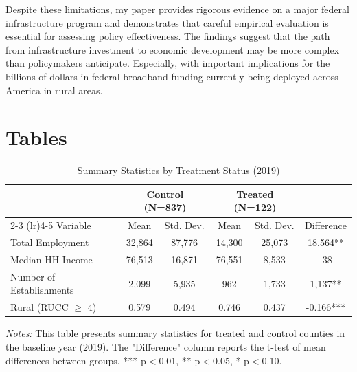\documentclass[12pt]{article}
\begin{document}
Despite these limitations, my paper provides rigorous evidence on a major federal infrastructure program and demonstrates that careful empirical evaluation is essential for assessing policy effectiveness. The findings suggest that the path from infrastructure investment to economic development may be more complex than policymakers anticipate. Especially, with important implications for the billions of dollars in federal broadband funding currently being deployed across America in rural areas.

\newpage


\section*{Tables}

\begin{table}[H]
\centering
\caption{Summary Statistics by Treatment Status (2019)}
\label{tab:summary}
\begin{tabular}{lccccc}
\toprule
& \multicolumn{2}{c}{Control (N=837)} & \multicolumn{2}{c}{Treated (N=122)} & \\
\cmidrule(lr){2-3} \cmidrule(lr){4-5}
Variable & Mean & Std. Dev. & Mean & Std. Dev. & Difference \\
\midrule
Total Employment & 32,864 & 87,776 & 14,300 & 25,073 & 18,564** \\
Median HH Income & 76,513 & 16,871 & 76,551 & 8,533 & -38 \\
Number of Establishments & 2,099 & 5,935 & 962 & 1,733 & 1,137** \\
Rural (RUCC $\geq$ 4) & 0.579 & 0.494 & 0.746 & 0.437 & -0.166*** \\
\bottomrule
\end{tabular}
\begin{tablenotes}
\small
\item \textit{Notes:} This table presents summary statistics for treated and control counties in the baseline year (2019). The "Difference" column reports the t-test of mean differences between groups. *** p$<$0.01, ** p$<$0.05, * p$<$0.10.
\end{tablenotes}
\end{table}
\end{document}
